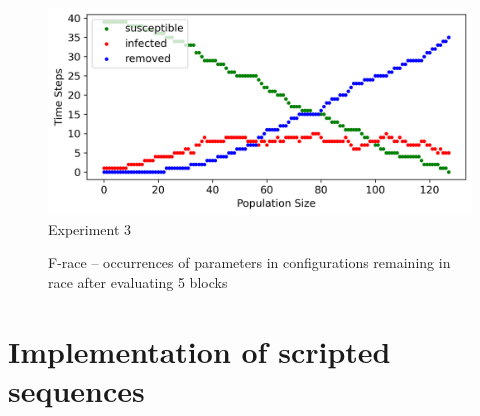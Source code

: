 \begin{figure}[h]
    \centering
    \includegraphics[width=1.0\textwidth]{images/chapter2/sir3/sir.png}
    \caption{Experiment 3}\label{fig:images/chapter2/sir3/sir.pn}
\end{figure}

\begin{figure}[h]
    \centering
    \hspace*{\fill}
    \hspace*{\fill}

    \caption{F-race -- occurrences of parameters in configurations remaining in race after evaluating 5 blocks} \label{fig:experiment3}
\end{figure}

\section{Implementation of scripted sequences}

